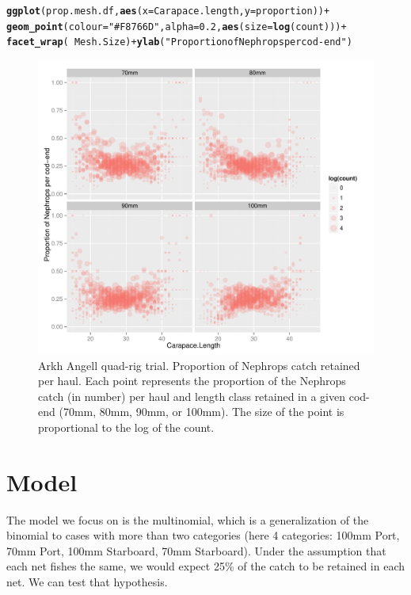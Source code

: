 \documentclass[12pt]{article}\usepackage[]{graphicx}\usepackage[]{color}
\makeatletter
\def\maxwidth{ %
  \ifdim\Gin@nat@width>\linewidth
    \linewidth
  \else
    \Gin@nat@width
  \fi
}
\newcommand{\hlnum}[1]{\textcolor[rgb]{0.686,0.059,0.569}{#1}}%
\newcommand{\hlstr}[1]{\textcolor[rgb]{0.192,0.494,0.8}{#1}}%
\newcommand{\hlopt}[1]{\textcolor[rgb]{0,0,0}{#1}}%
\newcommand{\hlstd}[1]{\textcolor[rgb]{0.345,0.345,0.345}{#1}}%
\newcommand{\hlkwc}[1]{\textcolor[rgb]{0.333,0.667,0.333}{#1}}%
\newcommand{\hlkwd}[1]{\textcolor[rgb]{0.737,0.353,0.396}{\textbf{#1}}}%
\newenvironment{kframe}{%
 \def\at@end@of@kframe{}%
 \ifinner\ifhmode%
  \def\at@end@of@kframe{\end{minipage}}%
  \begin{minipage}{\columnwidth}%
 \fi\fi%
 \def\FrameCommand##1{\hskip\@totalleftmargin \hskip-\fboxsep
 \colorbox{shadecolor}{##1}\hskip-\fboxsep
     \hskip-\linewidth \hskip-\@totalleftmargin \hskip\columnwidth}%
 \MakeFramed {\advance\hsize-\width
   \@totalleftmargin\z@ \linewidth\hsize
   \@setminipage}}%
 {\par\unskip\endMakeFramed%
 \at@end@of@kframe}
\newenvironment{knitrout}{}{} %
\makeatother
\begin{document}
\begin{knitrout}
\begin{kframe}
\begin{alltt}
\hlkwd{ggplot}\hlstd{(prop.mesh.df,} \hlkwd{aes}\hlstd{(}\hlkwc{x} \hlstd{= Carapace.length,} \hlkwc{y} \hlstd{= proportion))} \hlopt{+}
  \hlkwd{geom_point}\hlstd{(}\hlkwc{colour} \hlstd{=} \hlstr{"#F8766D"}\hlstd{,} \hlkwc{alpha} \hlstd{=} \hlnum{0.2}\hlstd{,} \hlkwd{aes}\hlstd{(}\hlkwc{size} \hlstd{=} \hlkwd{log}\hlstd{(count)))} \hlopt{+}
  \hlkwd{facet_wrap}\hlstd{(}\hlopt{~} \hlstd{Mesh.Size)} \hlopt{+} \hlkwd{ylab}\hlstd{(}\hlstr{"Proportion of Nephrops per cod-end"}\hlstd{)}
\end{alltt}
\end{kframe}\begin{figure}
\includegraphics[width=\maxwidth]{figure/unnamed-chunk-4-1} \caption[Arkh Angell quad-rig trial]{Arkh Angell quad-rig trial. Proportion of Nephrops catch retained per haul. Each point represents the proportion of the Nephrops catch (in number) per haul and length class retained in a given cod-end (70mm, 80mm, 90mm, or 100mm). The size of the point is proportional to the log of the count.}\label{fig:unnamed-chunk-4}
\end{figure}


\end{knitrout}

\section{Model}
The model we focus on is the multinomial, which is a generalization of the binomial to cases with more than two categories (here 4 categories: 100mm Port, 70mm Port, 100mm Starboard, 70mm Starboard). Under the assumption that each net fishes the same, we would expect 25\% of the catch to be retained in each net. We can test that hypothesis.
\end{document}
